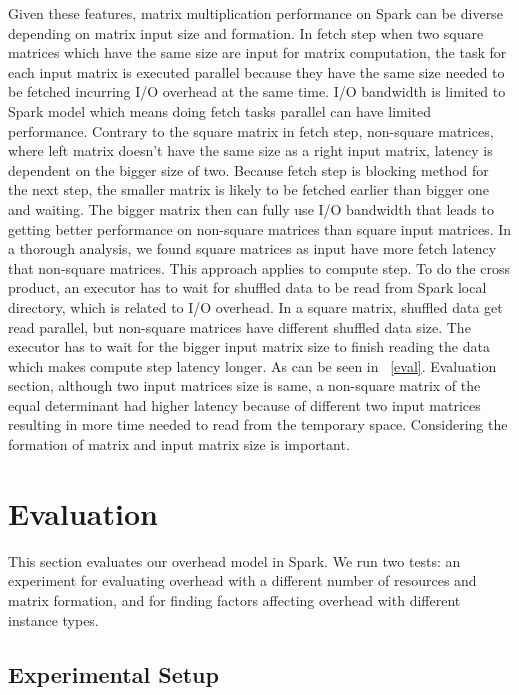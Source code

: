 \documentclass[10pt, conference, compsocconf]{IEEEtran}
\begin{document}
Given these features, matrix multiplication performance on Spark can be diverse depending on matrix input size and formation. In fetch step when two square matrices which have the same size are input for matrix computation, the task for each input matrix is executed parallel because they have the same size needed to be fetched incurring I/O overhead at the same time. I/O bandwidth is limited to Spark model which means doing fetch tasks parallel can have limited performance. Contrary to the square matrix in fetch step, non-square matrices, where left matrix doesn't have the same size as a right input matrix, latency is dependent on the bigger size of two. Because fetch step is blocking method for the next step, the smaller matrix is likely to be fetched earlier than bigger one and waiting. The bigger matrix then can fully use I/O bandwidth that leads to getting better performance on non-square matrices than square input matrices. In a thorough analysis, we found square matrices as input have more fetch latency that non-square matrices. This approach applies to compute step. To do the cross product, an executor has to wait for shuffled data to be read from Spark local directory, which is related to I/O overhead. In a square matrix, shuffled data get read parallel, but non-square matrices have different shuffled data size. The executor has to wait for the bigger input matrix size to finish reading the data which makes compute step latency longer. As can be seen in ~\ref{eval}. Evaluation section, although two input matrices size is same, a non-square matrix of the equal determinant had higher latency because of different two input matrices resulting in more time needed to read from the temporary space. Considering the formation of matrix and input matrix size is important.


\section{Evaluation}{\label{eval}}

This section evaluates our overhead model in Spark. We run two tests: an experiment for evaluating overhead with a different number of resources and matrix formation, and for finding factors affecting overhead with different instance types. 
\subsection{Experimental Setup}
\end{document}
